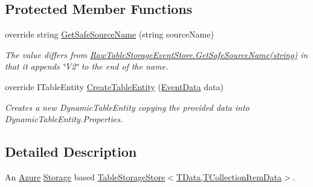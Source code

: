 \subsection*{Protected Member Functions}
\begin{DoxyCompactItemize}
\item 
override string \hyperlink{classCqrs_1_1Azure_1_1Storage_1_1Events_1_1TableStorageEventStore_1_1RawTableStorageEventStorer_a1da892250407e9d6e184c27f45f24cff_a1da892250407e9d6e184c27f45f24cff}{Get\+Safe\+Source\+Name} (string source\+Name)
\begin{DoxyCompactList}\small\item\em The value differs from \hyperlink{classCqrs_1_1Azure_1_1BlobStorage_1_1Events_1_1TableStorageEventStore_1_1RawTableStorageEventStore_ab02dd26098d25c2663abdf3da9f57f0f_ab02dd26098d25c2663abdf3da9f57f0f}{Raw\+Table\+Storage\+Event\+Store.\+Get\+Safe\+Source\+Name(string)} in that it appends \char`\"{}\+V2\char`\"{} to the end of the name. \end{DoxyCompactList}\item 
override I\+Table\+Entity \hyperlink{classCqrs_1_1Azure_1_1Storage_1_1Events_1_1TableStorageEventStore_1_1RawTableStorageEventStorer_af509f62b1369a6642e9f13beeb1aaf8f_af509f62b1369a6642e9f13beeb1aaf8f}{Create\+Table\+Entity} (\hyperlink{classCqrs_1_1Events_1_1EventData}{Event\+Data} data)
\begin{DoxyCompactList}\small\item\em Creates a new Dynamic\+Table\+Entity copying the provided {\itshape data}  into Dynamic\+Table\+Entity.\+Properties. \end{DoxyCompactList}\end{DoxyCompactItemize}


\subsection{Detailed Description}
An \hyperlink{namespaceCqrs_1_1Azure}{Azure} \hyperlink{namespaceCqrs_1_1Azure_1_1Storage}{Storage} based \hyperlink{classCqrs_1_1Azure_1_1BlobStorage_1_1Events_1_1TableStorageEventStore_ad86c24c28321c16b1f3601b3e7d870c4_ad86c24c28321c16b1f3601b3e7d870c4}{Table\+Storage\+Store$<$\+T\+Data,\+T\+Collection\+Item\+Data$>$}. 



